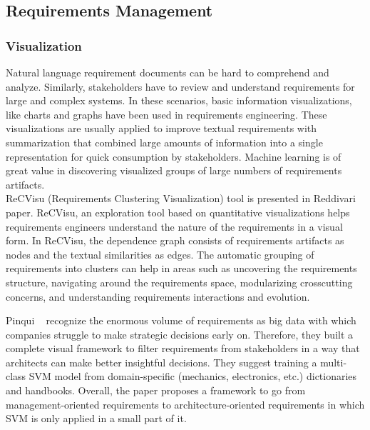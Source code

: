 \subsection{Requirements Management}

\subsubsection{Visualization}

Natural language requirement documents can be hard to comprehend and analyze. Similarly, stakeholders have to review and understand requirements for large and complex systems.  In these scenarios, basic information visualizations, like charts and graphs have been used in requirements engineering. These visualizations are usually applied to improve textual requirements with summarization that combined large amounts of information into a single representation for quick consumption by stakeholders\cite{Reddivari:2012}. Machine learning is of great value in discovering visualized groups of large numbers of requirements artifacts.\\

ReCVisu (Requirements Clustering Visualization) tool is presented in Reddivari \etal~\cite{Reddivari:2012} paper. ReCVisu, an exploration tool based on quantitative visualizations helps requirements engineers understand the nature of the requirements in a visual form. In ReCVisu, the dependence graph consists of requirements artifacts as nodes and the textual similarities as edges. The automatic grouping of requirements into clusters can help in areas such as uncovering the requirements structure, navigating around the requirements space, modularizing crosscutting concerns, and understanding requirements interactions and evolution.\newline

Pinqui \etal~\cite{Pinqui:2015} recognize the enormous volume of requirements as big data with which companies struggle to make strategic decisions early on. Therefore, they built a complete visual framework to filter requirements from stakeholders in a way that architects can make better insightful decisions. They suggest training a multi-class SVM model from domain-specific (mechanics, electronics, etc.) dictionaries and handbooks. Overall, the paper proposes a framework to go from management-oriented requirements to architecture-oriented requirements in which SVM is only applied in a small part of it. \newline

